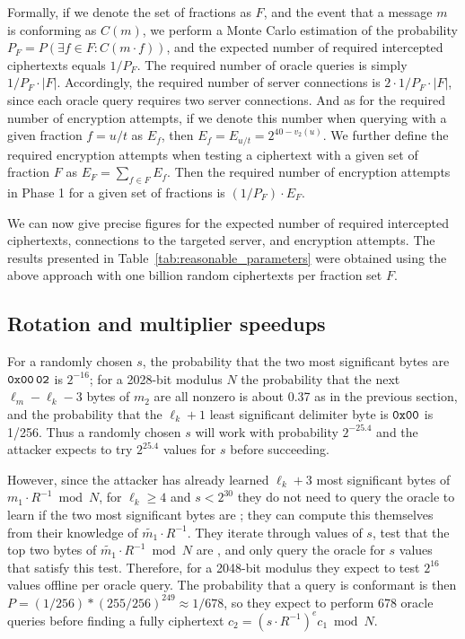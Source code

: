 Formally, if we denote the set of fractions as $F$, and the event that a message $m$ is conforming as $C(m)$, we perform a Monte Carlo estimation of the probability
$ P_F = P(\exists f \in F: C(m \cdot f)) $, and the expected number of required intercepted ciphertexts equals $1/{P_F}$.
The required number of oracle queries is simply $ 1/P_F \cdot |F| $.
Accordingly, the required number of server connections is $ 2 \cdot 1/P_F \cdot |F| $, since each oracle query requires two server connections.
And as for the required number of encryption attempts, if we denote this number when querying with a given fraction $f = u/t$ as $E_f$, then
$E_f = E_{u/t} = 2^{40-v_2(u)}$.
We further define the required encryption attempts when testing a ciphertext
with a given set of fraction $F$ as
$E_F = \sum_{f \in F} E_f$.
Then the required number of encryption attempts in Phase 1 for a given set of fractions is $(1/{P_F}) \cdot E_F$.

We can now give precise figures for the expected number of required intercepted ciphertexts, connections to the targeted server, and encryption attempts.
The results presented in Table~\ref{tab:reasonable_parameters} were obtained using the above approach with one billion random ciphertexts per fraction set $F$.

\subsection{Rotation and multiplier speedups}
\label{sec:rotation-details}

For a randomly chosen $s$, the probability that the two most significant bytes are ${\tt 0x00\hspace{0.06cm}02}$ is $2^{-16}$; for a 2028-bit modulus $N$ the probability that the next $\ell_m - \ell_k - 3$ bytes of $m_2$ are all nonzero is about 0.37 as in the previous section, and the probability that the $\ell_k+1$ least significant delimiter byte is ${\tt 0x00}$ is 1/256.  Thus a randomly chosen $s$ will work with probability $2^{-25.4}$ and the attacker expects to try $2^{25.4}$ values for $s$ before succeeding.

However, since the attacker has already learned $\ell_k+3$ most significant bytes of $m_1 \cdot R^{-1} \bmod N$,
for $\ell_k \ge 4$ and $s < 2^{30}$ they do not need to query the oracle to learn if the two most significant bytes are \sslconform; they can compute this themselves from their knowledge of $\tilde{m_1} \cdot R^{-1}$.  They iterate through values of $s$, test that the top two bytes of $\tilde{m_1} \cdot R^{-1} \bmod N$ are , and only query the oracle for $s$ values that satisfy this test. Therefore, for a 2048-bit modulus they expect to test $2^{16}$ values offline per oracle query.  The probability that a query is conformant is then $P = (1/256) * (255/256)^{249} \approx 1/678$, so they expect to perform 678 oracle queries before finding a fully \sslconform ciphertext $c_2 = (s \cdot R^{-1})^e c_1 \bmod N$.

